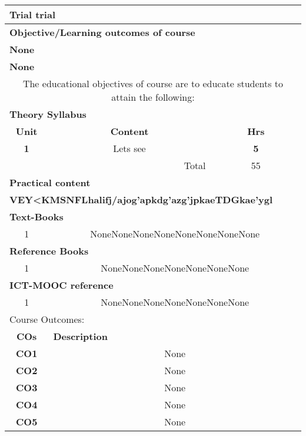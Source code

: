 \documentclass[a4paper]{article}%
\begin{document}
\begin{longtable}{|c|c|c|c|c|c|c|c|c|c|c|c|c|c|c|c|}
\multicolumn{16}{|l|}{Trial trial}\\%
\hline%
\multicolumn{16}{|l|}{\textbf{Objective/Learning outcomes of course}%
\cellcolor{black!30}}\\%
\multicolumn{16}{|l|}{\textbf{None}}\\%
\multicolumn{16}{|l|}{\textbf{None}}\\%
\hline%
\multicolumn{16}{|p{15cm}|}{The educational objectives of course are to educate students to attain the following:}\\%
\hline%
\multicolumn{16}{|l|}{\textbf{Theory Syllabus}%
\cellcolor{black!30}}\\%
\hline%
\textbf{Unit}&\multicolumn{14}{c|}{\textbf{Content}}&\textbf{Hrs}\\%
\hline%
\textbf{1}&\multicolumn{14}{|p{14cm}|}{Lets see}&\textbf{5}\\%
\hline%
\multicolumn{15}{|r|}{Total}&55\\%
\hline%
\multicolumn{16}{|l|}{\textbf{Practical content}%
\cellcolor{black!30}}\\%
\multicolumn{16}{|l|}{\textbf{VEY<KMSNFLhalifj/ajog'apkdg'azg'jpkaeTDGkae'ygl}}\\%
\hline%
\multicolumn{16}{|l|}{\textbf{Text{-}Books}%
\cellcolor{black!30}}\\%
\hline%
1&\multicolumn{15}{|p{15cm}|}{NoneNoneNoneNoneNoneNoneNoneNone}\\%
\hline%
\multicolumn{16}{|l|}{\textbf{Reference Books}%
\cellcolor{black!30}}\\%
\hline%
1&\multicolumn{15}{|p{15cm}|}{NoneNoneNoneNoneNoneNoneNone}\\%
\hline%
\multicolumn{16}{|l|}{\textbf{ICT{-}MOOC reference}%
\cellcolor{black!30}}\\%
\hline%
1&\multicolumn{15}{|p{15cm}|}{NoneNoneNoneNoneNoneNoneNone}\\%
\hline%
\multicolumn{16}{|l|}{Course Outcomes:%
\cellcolor{black!30}}\\%
\hline%
\textbf{COs}&\multicolumn{15}{|l|}{\textbf{Description}}\\%
\hline%
\textbf{CO1}&\multicolumn{15}{|p{15cm}|}{None}\\%
\hline%
\textbf{CO2}&\multicolumn{15}{|p{15cm}|}{None}\\%
\hline%
\textbf{CO3}&\multicolumn{15}{|p{15cm}|}{None}\\%
\hline%
\textbf{CO4}&\multicolumn{15}{|p{15cm}|}{None}\\%
\hline%
\textbf{CO5}&\multicolumn{15}{|p{15cm}|}{None}\\%

\end{longtable}
\end{document}
